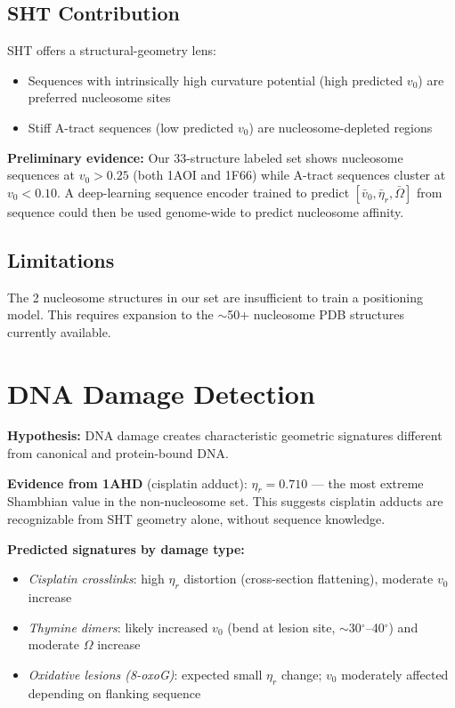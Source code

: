\subsection{SHT Contribution}

SHT offers a structural-geometry lens:
\begin{itemize}
    \item Sequences with intrinsically high curvature potential (high predicted $v_0$) are preferred nucleosome sites
    \item Stiff A-tract sequences (low predicted $v_0$) are nucleosome-depleted regions
\end{itemize}

\textbf{Preliminary evidence:} Our 33-structure labeled set shows nucleosome sequences at $v_0 > 0.25$ (both 1AOI and 1F66) while A-tract sequences cluster at $v_0 < 0.10$. A deep-learning sequence encoder trained to predict $[\bar{v}_0, \bar{\eta}_r, \bar{\Omega}]$ from sequence could then be used genome-wide to predict nucleosome affinity.

\subsection{Limitations}

The 2 nucleosome structures in our set are insufficient to train a positioning model. This requires expansion to the $\sim$50+ nucleosome PDB structures currently available.

\section{DNA Damage Detection}

\textbf{Hypothesis:} DNA damage creates characteristic geometric signatures different from canonical and protein-bound DNA.

\textbf{Evidence from 1AHD} (cisplatin adduct): $\eta_r = 0.710$ --- the most extreme Shambhian value in the non-nucleosome set. This suggests cisplatin adducts are recognizable from SHT geometry alone, without sequence knowledge.

\textbf{Predicted signatures by damage type:}
\begin{itemize}
    \item \textit{Cisplatin crosslinks}: high $\eta_r$ distortion (cross-section flattening), moderate $v_0$ increase
    \item \textit{Thymine dimers}: likely increased $v_0$ (bend at lesion site, $\sim$30$^\circ$--40$^\circ$) and moderate $\Omega$ increase
    \item \textit{Oxidative lesions (8-oxoG)}: expected small $\eta_r$ change; $v_0$ moderately affected depending on flanking sequence
\end{itemize}

